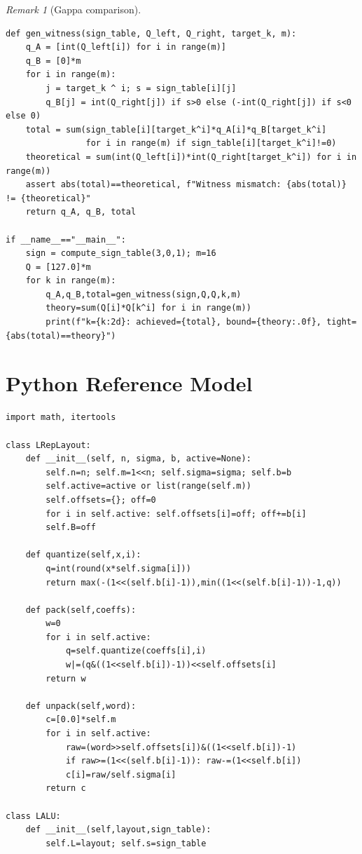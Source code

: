 \documentclass[11pt,a4paper]{article}
\theoremstyle{definition}
\theoremstyle{plain}
\theoremstyle{remark}
\newtheorem{remark}{Remark}[section]
\begin{document}
\begin{remark}[Gappa comparison]
\begin{lstlisting}[caption={Python adversarial witness generator (proves Theorem 3 tightness)},
  label=lst:witness]
def gen_witness(sign_table, Q_left, Q_right, target_k, m):
    q_A = [int(Q_left[i]) for i in range(m)]
    q_B = [0]*m
    for i in range(m):
        j = target_k ^ i; s = sign_table[i][j]
        q_B[j] = int(Q_right[j]) if s>0 else (-int(Q_right[j]) if s<0 else 0)
    total = sum(sign_table[i][target_k^i]*q_A[i]*q_B[target_k^i]
                for i in range(m) if sign_table[i][target_k^i]!=0)
    theoretical = sum(int(Q_left[i])*int(Q_right[target_k^i]) for i in range(m))
    assert abs(total)==theoretical, f"Witness mismatch: {abs(total)} != {theoretical}"
    return q_A, q_B, total

if __name__=="__main__":
    sign = compute_sign_table(3,0,1); m=16
    Q = [127.0]*m
    for k in range(m):
        q_A,q_B,total=gen_witness(sign,Q,Q,k,m)
        theory=sum(Q[i]*Q[k^i] for i in range(m))
        print(f"k={k:2d}: achieved={total}, bound={theory:.0f}, tight={abs(total)==theory}")
\end{lstlisting}

\section{Python Reference Model}
\label{app:sim}

\begin{lstlisting}[caption={Complete Python reference model for L-Rep},
  label=lst:python]
import math, itertools

class LRepLayout:
    def __init__(self, n, sigma, b, active=None):
        self.n=n; self.m=1<<n; self.sigma=sigma; self.b=b
        self.active=active or list(range(self.m))
        self.offsets={}; off=0
        for i in self.active: self.offsets[i]=off; off+=b[i]
        self.B=off

    def quantize(self,x,i):
        q=int(round(x*self.sigma[i]))
        return max(-(1<<(self.b[i]-1)),min((1<<(self.b[i]-1))-1,q))

    def pack(self,coeffs):
        w=0
        for i in self.active:
            q=self.quantize(coeffs[i],i)
            w|=(q&((1<<self.b[i])-1))<<self.offsets[i]
        return w

    def unpack(self,word):
        c=[0.0]*self.m
        for i in self.active:
            raw=(word>>self.offsets[i])&((1<<self.b[i])-1)
            if raw>=(1<<(self.b[i]-1)): raw-=(1<<self.b[i])
            c[i]=raw/self.sigma[i]
        return c

class LALU:
    def __init__(self,layout,sign_table):
        self.L=layout; self.s=sign_table


\end{lstlisting}
\end{remark}
\end{document}
